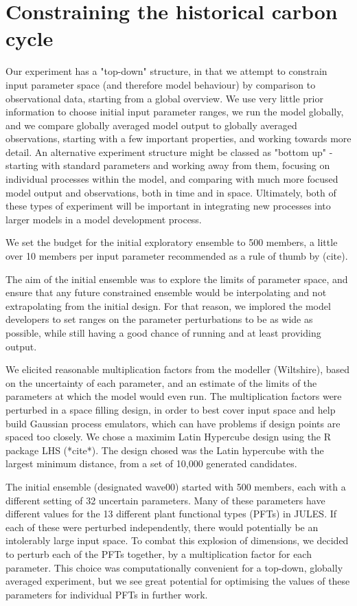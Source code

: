 \documentclass[gmd, manuscript]{copernicus}
\begin{document}
\section{Constraining the historical carbon cycle}

Our experiment has a "top-down" structure, in that we attempt to constrain input parameter space (and therefore model behaviour) by comparison to observational data, starting from a global overview. We use very little prior information to choose initial input parameter ranges, we run the model globally, and we compare globally averaged model output to globally averaged observations, starting with a few important properties, and working towards more detail. An alternative experiment structure might be classed as "bottom up" - starting with standard parameters and working away from them, focusing on individual processes within the model, and comparing with much more focused model output and observations, both in time and in space. Ultimately, both of these types of experiment will be important in integrating new processes into larger models in a model development process.

We set the budget for the initial exploratory ensemble to 500 members, a little over 10 members per input parameter recommended as a rule of thumb by (cite). 

The aim of the initial ensemble was to explore the limits of parameter space, and ensure that any future constrained ensemble would be interpolating and not extrapolating from the initial design. For that reason, we implored the model developers to set ranges on the parameter perturbations to be as wide as possible, while still having a good chance of running and at least providing output.

We elicited reasonable multiplication factors from the modeller (Wiltshire), based on the uncertainty of each parameter, and an estimate of the limits of the parameters at which the model would even run. The multiplication factors were perturbed in a space filling design, in order to best cover input space and help build Gaussian process emulators, which can have problems if design points are spaced too closely. We chose a maximim Latin Hypercube design using the R package LHS (*cite*). The design chosed was the Latin hypercube with the largest minimum distance, from a set of 10,000 generated candidates.

The initial ensemble (designated wave00) started with 500 members, each with a different setting of 32 uncertain parameters. Many of these parameters have different values for the 13 different plant functional types (PFTs) in JULES. If each of these were perturbed independently, there would potentially be an intolerably large input space. To combat this explosion of dimensions, we decided to perturb each of the PFTs together, by a multiplication factor for each parameter. This choice was computationally convenient for a top-down, globally averaged experiment, but we see great potential for optimising the values of these parameters for individual PFTs in further work. 
\end{document}
